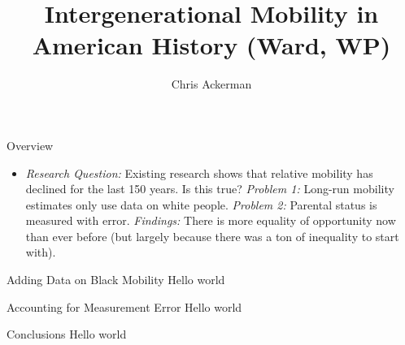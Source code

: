 \documentclass[dvipsnames]{beamer}
\title{Intergenerational Mobility in American History (Ward, WP)}
\author{Chris Ackerman}
\begin{document}
\maketitle
\begin{frame}{Overview}
  \begin{itemize}
  \item \emph{Research Question:} Existing research shows that relative mobility has declined for the last 150 years. Is this true?
  \vitem \emph{Problem 1:} Long-run mobility estimates only use data on white people.
  \vitem \emph{Problem 2:} Parental status is measured with error.
  \vitem \emph{Findings:} There is more equality of opportunity now than ever before (but largely because there was a ton of inequality to start with).
  \end{itemize}
\end{frame}
%
\begin{frame}{Adding Data on Black Mobility}
 Hello world 
\end{frame}
%
\begin{frame}{Accounting for Measurement Error}
 Hello world 
\end{frame}
%
\begin{frame}{Conclusions}
 Hello world 
\end{frame}
\end{document}
